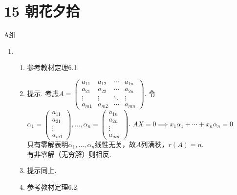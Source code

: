 \section*{15 朝花夕拾}

\vspace{2ex}

\centerline{\heiti A组}
\begin{enumerate}
    \item \begin{enumerate}
              \item 参考教材定理6.1.

              \item 提示. 考虑$A=\begin{pmatrix}
                            a_{11} & a_{12} & \cdots & a_{1n} \\
                            a_{21} & a_{22} & \cdots & a_{2n} \\
                            \vdots & \vdots & \ddots & \vdots \\
                            a_{m1} & a_{m2} & \cdots & a_{mn}
                        \end{pmatrix}$. 令$\alpha_1=\begin{pmatrix}
                            a_{11} \\
                            a_{21} \\
                            \vdots \\
                            a_{m1}
                        \end{pmatrix},\ldots,\alpha_n=\begin{pmatrix}
                            a_{1n} \\
                            a_{2n} \\
                            \vdots \\
                            a_{mn}
                        \end{pmatrix}$. $AX=0\implies x_1\alpha_1+\cdots+x_n\alpha_n=0$\\
                    只有零解表明$\alpha_1,\ldots,\alpha_n$线性无关，故$A$列满秩，$r(A)=n$.\\
                    有非零解（无穷解）则相反.

              \item 提示同上.

              \item 参考教材定理6.2.


\end{enumerate}
\end{enumerate}
